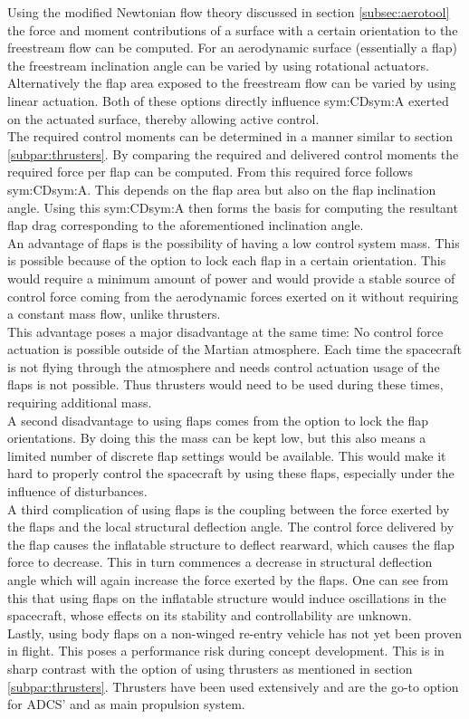 Using the modified Newtonian flow theory discussed in section \ref{subsec:aerotool} the force and moment contributions of a surface with a certain orientation to the freestream flow can be computed. For an aerodynamic surface (essentially a flap) the freestream inclination angle can be varied by using rotational actuators. Alternatively the flap area exposed to the freestream flow can be varied by using linear actuation. Both of these options directly influence \gls{sym:CD}\gls{sym:A} exerted on the actuated surface, thereby allowing active control.\\
The required control moments can be determined in a manner similar to section \ref{subpar:thrusters}. By comparing the required and delivered control moments the required force per flap can be computed. From this required force follows \gls{sym:CD}\gls{sym:A}. This depends on the flap area but also on the flap inclination angle. Using this \gls{sym:CD}\gls{sym:A} then forms the basis for computing the resultant flap drag corresponding to the aforementioned inclination angle.\\
An advantage of flaps is the possibility of having a low control system mass. This is possible because of the option to lock each flap in a certain orientation. This would require a minimum amount of power and would provide a stable source of control force coming from the aerodynamic forces exerted on it without requiring a constant mass flow, unlike thrusters.\\
This advantage poses a major disadvantage at the same time: No control force actuation is possible outside of the Martian atmosphere. Each time the spacecraft is not flying through the atmosphere and needs control actuation usage of the flaps is not possible. Thus thrusters would need to be used during these times, requiring additional mass.\\
A second disadvantage to using flaps comes from the option to lock the flap orientations. By doing this the mass can be kept low, but this also means a limited number of discrete flap settings would be available. This would make it hard to properly control the spacecraft by using these flaps, especially under the influence of disturbances.\\
A third complication of using flaps is the coupling between the force exerted by the flaps and the local structural deflection angle. The control force delivered by the flap causes the inflatable structure to deflect rearward, which causes the flap force to decrease. This in turn commences a decrease in structural deflection angle which will again increase the force exerted by the flaps. One can see from this that using flaps on the inflatable structure would induce oscillations in the spacecraft, whose effects on its stability and controllability are unknown.\\
Lastly, using body flaps on a non-winged re-entry vehicle has not yet been proven in flight. This poses a performance risk during concept development. This is in sharp contrast with the option of using thrusters as mentioned in section \ref{subpar:thrusters}. Thrusters have been used extensively and are the go-to option for ADCS' and as main propulsion system.
